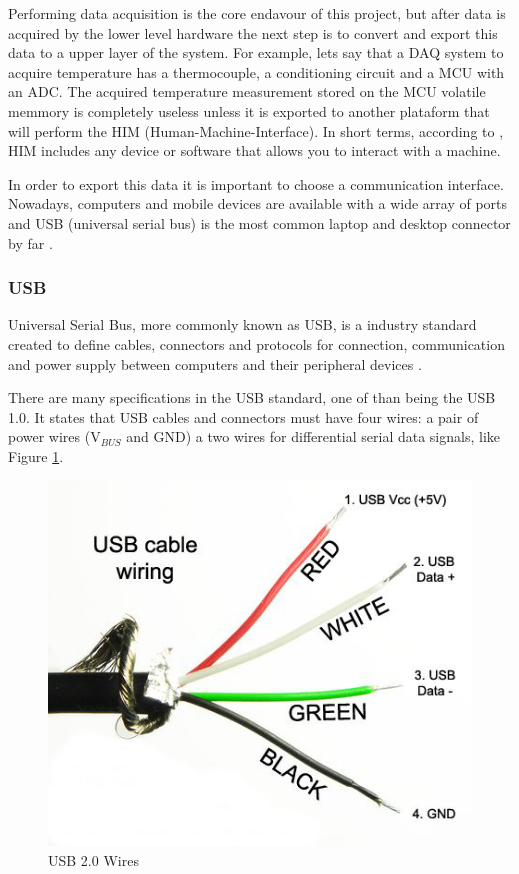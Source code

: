 	Performing data acquisition is the core endavour of this project, but after data is acquired by the lower level hardware the next step is to convert and export this data to a upper layer of the system. For example, lets say that a DAQ system to acquire temperature has a thermocouple, a conditioning circuit and a MCU with an ADC. The acquired temperature measurement stored on the MCU volatile memmory is completely useless unless it is exported to another plataform that will perform the HIM (Human-Machine-Interface). In short terms, according to \cite{gonzalez2015him}, HIM includes any device or software that allows you to interact with a machine.
	\par
	In order to export this data it is important to choose a communication interface. Nowadays, computers and mobile devices are available with a wide array of ports and USB (universal serial bus) is the most common laptop and desktop connector by far \cite{plitch2017ports}.

	\subsubsection{USB}\label{sssec:usb}
		Universal Serial Bus, more commonly known as USB, is a industry standard created to define cables, connectors and protocols for connection, communication and power supply between computers and their peripheral devices \cite{garfinkel1995usb}.
		\par
		There are many specifications in the USB standard, one of than being the USB 1.0. It states that USB cables and connectors must have four wires: a pair of power wires (V$_{BUS}$ and GND) a two wires for differential serial data signals, like Figure \ref{fig:usb2.0-wires}.
		

			\begin{figure}[htbp]
				\centering
					\includegraphics[scale=0.5]{figuras/fig-usb2-0-wires}
				\caption{USB 2.0 Wires \cite{usb2.0-wires}}
				\label{fig:usb2.0-wires}
			\end{figure}

